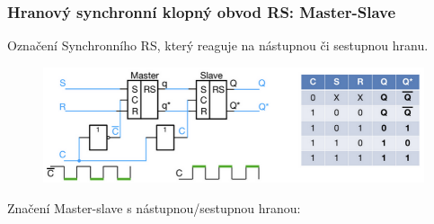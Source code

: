 \subsubsection{Hranový synchronní klopný obvod RS: Master-Slave}
Označení Synchronního RS, který reaguje na nástupnou či sestupnou hranu.\\
\begin{figure}[h!]
    \centering
    \includegraphics[scale = 0.5]{img/MS.png}
\end{figure}
\newpage
Značení Master-slave s nástupnou/sestupnou hranou:
